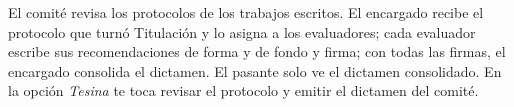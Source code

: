\documentclass[11pt,a4paper]{article}
\begin{document}
{\small\tableofcontents}
\newpage
\begin{quevasahacer}
El comité revisa los protocolos de los trabajos escritos. El encargado recibe el protocolo que turnó Titulación y lo asigna a los evaluadores; cada evaluador escribe sus recomendaciones de forma y de fondo y firma; con todas las firmas, el encargado consolida el dictamen. El pasante solo ve el dictamen consolidado. En la opción \emph{Tesina} te toca revisar el protocolo y emitir el dictamen del comité.
\end{quevasahacer}



\end{document}
